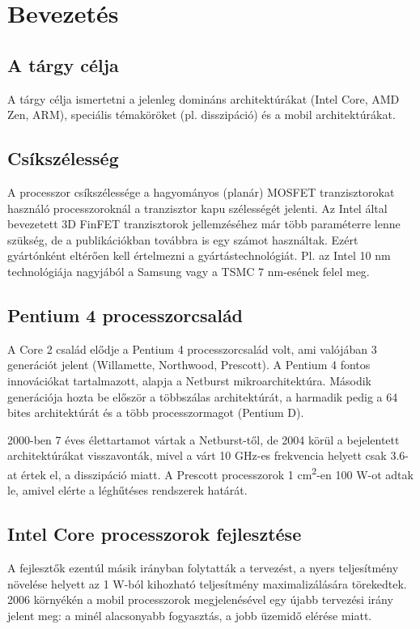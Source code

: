 
\chapter{Bevezetés}

\section{A tárgy célja}
A tárgy célja ismertetni a jelenleg domináns architektúrákat (Intel Core, AMD Zen, ARM), speciális témaköröket (pl. disszipáció) és a mobil architektúrákat.

\section{Csíkszélesség}
A processzor csíkszélessége a hagyományos (planár) MOSFET tranzisztorokat használó processzoroknál a tranzisztor kapu szélességét jelenti.
Az Intel által bevezetett 3D FinFET tranzisztorok jellemzéséhez már több paraméterre lenne szükség, de a publikációkban továbbra is egy számot használtak.
Ezért gyártónként eltérően kell értelmezni a gyártástechnológiát. Pl. az Intel 10 nm technológiája nagyjából a Samsung vagy a TSMC 7 nm-esének felel meg.

\section{Pentium 4 processzorcsalád}
A Core 2 család elődje a Pentium 4 processzorcsalád volt, ami valójában 3 generációt jelent (Willamette, Northwood, Prescott).
A Pentium 4 fontos innovációkat tartalmazott, alapja a Netburst mikroarchitektúra.
Második generációja hozta be először a többszálas architektúrát, a harmadik pedig a 64 bites architektúrát és a több processzormagot (Pentium D).

2000-ben 7 éves élettartamot vártak a Netburst-től, de 2004 körül a bejelentett architektúrákat visszavonták, mivel a várt 10 GHz-es frekvencia helyett csak 3.6-at értek el, a disszipáció miatt.
A Prescott processzorok 1 cm\textsuperscript{2}-en 100 W-ot adtak le, amivel elérte a léghűtéses rendszerek határát.

\section{Intel Core processzorok fejlesztése}
A fejlesztők ezentúl másik irányban folytatták a tervezést, a nyers teljesítmény növelése helyett az 1 W-ból kihozható teljesítmény maximalizálására törekedtek.
2006 környékén a mobil processzorok megjelenésével egy újabb tervezési irány jelent meg: a minél alacsonyabb fogyasztás, a jobb üzemidő elérése miatt.

